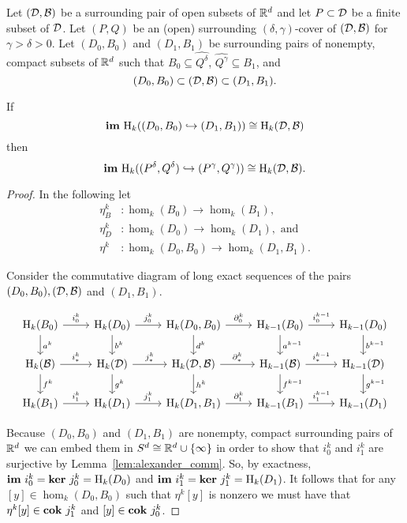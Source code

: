 
\begin{theorem}\label{thm:main}
  Let $({\mathcal{D}}, {\mathcal{B}})$ be a surrounding pair of open subsets of $\mathbb{R}^d$ and let $P\subset {\mathcal{D}}$ be a finite subset of ${\mathcal{D}}$.
  Let $(P, Q)$ be an (open) surrounding $(\delta,\gamma)$-cover of $({\mathcal{D}}, {\mathcal{B}})$ for $\gamma > \delta > 0$.
  Let $(D_0, B_0)$ and $(D_1, B_1)$ be surrounding pairs of nonempty, compact subsets of $\mathbb{R}^d$ such that $B_0\subseteq \hat{Q^\delta}$, $\hat{Q^\gamma}\subseteq B_1$, and
  \[ (D_0, B_0)\subset ({\mathcal{D}}, {\mathcal{B}}) \subset (D_1, B_1).\]

  If
  \[\mathbf{im}~\mathrm{H}_k((D_0, B_0)\hookrightarrow (D_1, B_1))\cong \mathrm{H}_k({\mathcal{D}}, {\mathcal{B}})\]
  then
  \[\mathbf{im}~\mathrm{H}_k((P^\delta, Q^\delta)\hookrightarrow (P^\gamma, Q^\gamma))\cong \mathrm{H}_k({\mathcal{D}}, {\mathcal{B}}).\]
\end{theorem}
\begin{proof}

  In the following let
  \begin{align*}
    \eta_B^k &: \hom_k(B_0)\to \hom_k(B_1),\\
    \eta_D^k &: \hom_k(D_0)\to \hom_k(D_1),\text{ and }\\
    \eta^k &: \hom_k(D_0, B_0)\to \hom_k(D_1, B_1).
  \end{align*}

  Consider the commutative diagram of long exact sequences of the pairs $(D_0, B_0), ({\mathcal{D}}, {\mathcal{B}})$ and $(D_1, B_1)$.

  \begin{equation}\begin{tikzcd}
      \hom_k(B_0)\arrow{r}{i^k_0}\arrow{d}{a^k} &
      \hom_k(D_0)\arrow{r}{j^k_0} \arrow{d}{b^k} &
      \hom_k(D_0, B_0)\arrow{r}{\partial^k_0}\arrow{d}{d^k} &
      \hom_{k-1}(B_0)\arrow{r}{i^{k-1}_0}\arrow{d}{a^{k-1}} &
      \hom_{k-1}(D_0) \arrow{d}{b^{k-1}}\\
      \hom_k(\B)\arrow{r}{i_*^k}\arrow{d}{f^k} &
      \hom_k(\D)\arrow{r}{j_*^k}\arrow{d}{g^k} &
      \hom_k(\D, \B)\arrow{r}{\partial_*^k}\arrow{d}{h^k} &
      \hom_{k-1}(\B)\arrow{r}{i_*^{k-1}}\arrow{d}{f^{k-1}} &
      \hom_{k-1}(\D)\arrow{d}{g^{k-1}}\\
      \hom_k(B_1)\arrow{r}{i^k_1} &
      \hom_k(D_1)\arrow{r}{j^k_1} &
      \hom_k(D_1, B_1)\arrow{r}{\partial^k_1} &
      \hom_{k-1}(B_1)\arrow{r}{i^{k-1}_1} &
      \hom_{k-1}(D_1)
  \end{tikzcd}\end{equation}

  Because $(D_0, B_0)$ and $(D_1, B_1)$ are nonempty, compact surrounding pairs of $\mathbb{R}^d$ we can embed them in $S^d \cong \mathbb{R}^d\cup\{\infty\}$ in order to show that $i_0^k$ and $i_1^k$ are surjective by Lemma~\ref{lem:alexander_comm}.
  So, by exactness, $\mathbf{im}~i_0^k = \mathbf{ker}~j_0^k = \mathrm{H}_k(D_0)$ and $\mathbf{im}~i_1^k = \mathbf{ker}~j_1^k = \mathrm{H}_k(D_1)$.
  It follows that for any $[y]\in \hom_k(D_0, B_0)$ such that $\eta^k[y]$ is nonzero we must have that $\eta^k[y]\in\mathbf{cok}~j^k_1$ and $[y]\in\mathbf{cok}~j^k_0$.


\end{proof}
